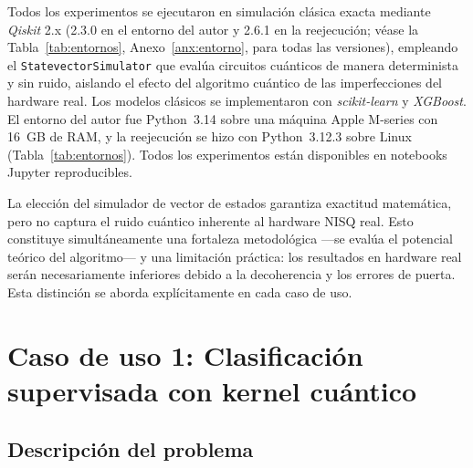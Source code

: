 Todos los experimentos se ejecutaron en simulación clásica exacta mediante \textit{Qiskit} 2.x \citep{Qiskit} (2.3.0 en el entorno del autor y 2.6.1 en la reejecución; véase la Tabla~\ref{tab:entornos}, Anexo~\ref{anx:entorno}, para todas las versiones), empleando el \texttt{StatevectorSimulator} que evalúa circuitos cuánticos de manera determinista y sin ruido, aislando el efecto del algoritmo cuántico de las imperfecciones del hardware real. Los modelos clásicos se implementaron con \textit{scikit-learn} y \textit{XGBoost}. El entorno del autor fue Python~3.14 sobre una máquina Apple M-series con 16~GB de RAM, y la reejecución se hizo con Python~3.12.3 sobre Linux (Tabla~\ref{tab:entornos}). Todos los experimentos están disponibles en notebooks Jupyter reproducibles.

La elección del simulador de vector de estados garantiza exactitud matemática, pero no captura el ruido cuántico inherente al hardware NISQ real. Esto constituye simultáneamente una fortaleza metodológica ---se evalúa el potencial teórico del algoritmo--- y una limitación práctica: los resultados en hardware real serán necesariamente inferiores debido a la decoherencia y los errores de puerta. Esta distinción se aborda explícitamente en cada caso de uso.

\section{Caso de uso 1: Clasificación supervisada con kernel cuántico}

\subsection{Descripción del problema}

